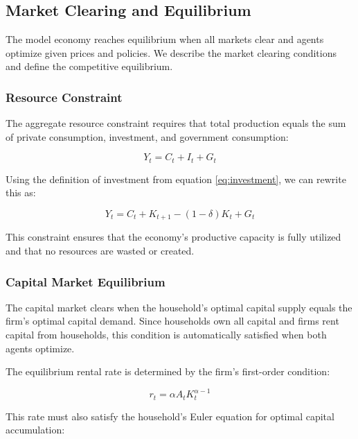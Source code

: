 \documentclass[5p,authoryear]{elsarticle}
\begin{document}
\subsection{Market Clearing and Equilibrium}

The model economy reaches equilibrium when all markets clear and agents optimize given prices and policies. We describe the market clearing conditions and define the competitive equilibrium.

\subsubsection{Resource Constraint}

The aggregate resource constraint requires that total production equals the sum of private consumption, investment, and government consumption:

\begin{equation}
Y_t = C_t + I_t + G_t
\label{eq:resource_constraint}
\end{equation}

Using the definition of investment from equation \eqref{eq:investment}, we can rewrite this as:

\begin{equation}
Y_t = C_t + K_{t+1} - (1-\delta) K_t + G_t
\label{eq:resource_constraint_detailed}
\end{equation}

This constraint ensures that the economy's productive capacity is fully utilized and that no resources are wasted or created.

\subsubsection{Capital Market Equilibrium}

The capital market clears when the household's optimal capital supply equals the firm's optimal capital demand. Since households own all capital and firms rent capital from households, this condition is automatically satisfied when both agents optimize.

The equilibrium rental rate is determined by the firm's first-order condition:

\begin{equation}
r_t = \alpha A_t K_t^{\alpha-1}
\label{eq:equilibrium_rental_rate}
\end{equation}

This rate must also satisfy the household's Euler equation for optimal capital accumulation:
\end{document}
